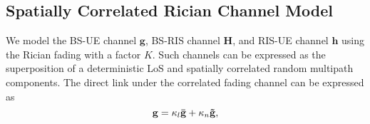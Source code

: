 \documentclass[journal,draftclsnofoot,onecolumn,12pt]{IEEEtran}
\begin{document}
% 
% 
\vspace{-.4cm}\subsection{Spatially Correlated Rician Channel Model}\label{channel model}\vspace{-.2cm}
 We model the BS-UE channel $\mathbf{g}$, BS-RIS channel $\mathbf{H}$, and RIS-UE channel $\mathbf{h}$  using the Rician fading with a factor $K$. Such channels can be expressed as the superposition of a deterministic LoS and spatially correlated random multipath components. The direct link under the correlated fading channel can be expressed as 
\begin{equation}
    \mathbf{g} = \kappa_l\mathbf{\Bar{g}} + \kappa_n\mathbf{\Tilde{g}},\label{directlink}
\end{equation}
\end{document}
